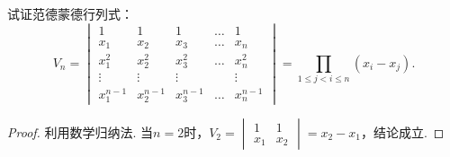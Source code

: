 \begin{example}
试证范德蒙德行列式：
\begin{equation}\label{equation:行列式.范德蒙德行列式}
V_n = \begin{vmatrix}
1 & 1 & 1 & \dots & 1 \\
x_1 & x_2 & x_3 & \dots & x_n \\
x_1^2 & x_2^2 & x_3^2 & \dots & x_n^2 \\
\vdots & \vdots & \vdots& & \vdots \\
x_1^{n-1} & x_2^{n-1} & x_3^{n-1} & \dots & x_n^{n-1}
\end{vmatrix}=\prod\limits_{1 \leqslant j < i \leqslant n}(x_i-x_j).
\end{equation}
\begin{proof}
利用数学归纳法.
当\(n=2\)时，\(V_2 = \begin{vmatrix}
	1 & 1 \\ x_1 & x_2
\end{vmatrix} = x_2 - x_1\)，结论成立.


\end{proof}
\end{example}
